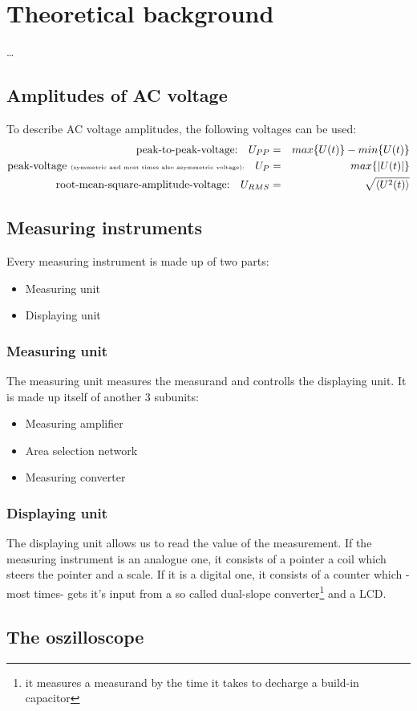 \section{Theoretical background}
…\subsection{Amplitudes of AC voltage}
To describe AC voltage amplitudes, the following voltages can be used:
\begin{eqnarray*}
	\text{peak-to-peak-voltage:}\quad U_{PP}&=&max\{U(t)\}-min\{U(t)\}\\
	\text{peak-voltage \tiny{(symmetric and most times also asymmetric voltage)}:}\quad U_P&=&max\{|U(t)|\}\\
	\text{root-mean-square-amplitude-voltage:}\quad U_{RMS}&=&\sqrt{\left<U^2(t)\right>}
\end{eqnarray*}
\subsection{Measuring instruments}
Every measuring instrument is made up of two parts:
\begin{itemize}
	\item{Measuring unit}
	\item{Displaying unit}
\end{itemize}
\subsubsection{Measuring unit}
The measuring unit measures the measurand and controlls the displaying unit. It is made up itself of another 3 subunits:
\begin{itemize}
	\item{Measuring amplifier}
	\item{Area selection network}
	\item{Measuring converter}
\end{itemize}
\subsubsection{Displaying unit}
The displaying unit allows us to read the value of the measurement. If the measuring instrument is an analogue one, it consists of a pointer a coil which steers the pointer and a scale. If it is a digital one, it consists of a counter which -most times- gets it's input from a so called dual-slope converter\footnote{it measures a measurand by the time it takes to decharge a build-in capacitor} and a LCD.
\subsection{The oszilloscope}
